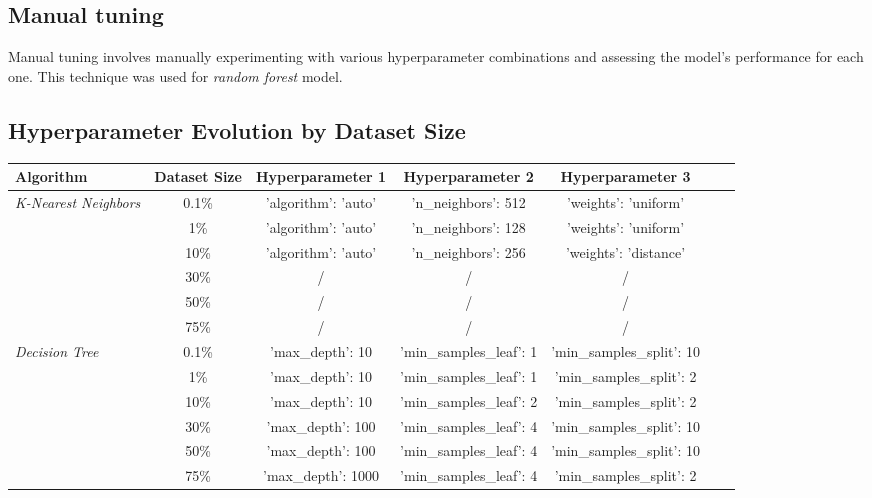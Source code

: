 \documentclass[12pt, titlepage]{article}
\begin{document}
\subsection{Manual tuning}

Manual tuning involves manually experimenting with various hyperparameter combinations and assessing the model's performance for each one. This technique was used for \textit{random forest} model.

\subsection{Hyperparameter Evolution by Dataset Size}

\begin{table}[ht]
    \centering
    \footnotesize %
    \begin{tabular}{|l|c|c|c|c|c|c|}
        \hline
        \textbf{Algorithm} & \textbf{Dataset Size} & \textbf{Hyperparameter 1} & \textbf{Hyperparameter 2} & \textbf{Hyperparameter 3} \\
        \hline
        \multirow{4}{*}{\textit{K-Nearest Neighbors}} 
        & 0.1\% & 'algorithm': 'auto' & 'n\_neighbors': 512 & 'weights': 'uniform' \\
        & 1\% & 'algorithm': 'auto' & 'n\_neighbors': 128 & 'weights': 'uniform' \\
        & 10\% & 'algorithm': 'auto' & 'n\_neighbors': 256 & 'weights': 'distance' \\
        & 30\% & / & / & / \\
        & 50\% & / & / & / \\
        & 75\% & / & / & / \\
        \hline
        \multirow{4}{*}{\textit{Decision Tree}} 
        & 0.1\% & 'max\_depth': 10 & 'min\_samples\_leaf': 1 & 'min\_samples\_split': 10 \\
        & 1\% & 'max\_depth': 10 & 'min\_samples\_leaf': 1 & 'min\_samples\_split': 2 \\
        & 10\% & 'max\_depth': 10 & 'min\_samples\_leaf': 2 & 'min\_samples\_split': 2 \\
        & 30\% & 'max\_depth': 100 & 'min\_samples\_leaf': 4 & 'min\_samples\_split': 10 \\
        & 50\% & 'max\_depth': 100 & 'min\_samples\_leaf': 4 & 'min\_samples\_split': 10 \\
        & 75\% & 'max\_depth': 1000 & 'min\_samples\_leaf': 4 & 'min\_samples\_split': 2 \\

\end{tabular}
\end{table}
\end{document}
